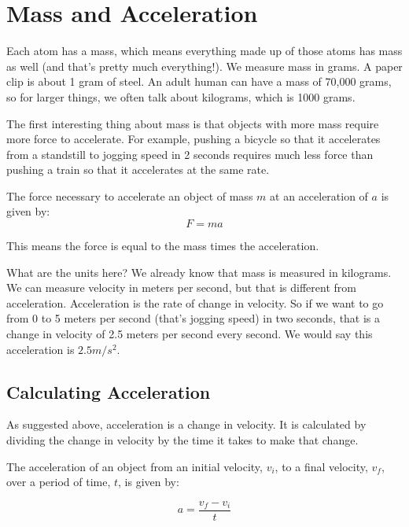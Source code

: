 \section{Mass and Acceleration}

Each atom has a mass, which means everything made up of those atoms has mass as well (and that's pretty much everything!). We measure mass in grams. A
paper clip is about 1 gram of steel. An adult human can have a mass of 70,000
grams, so for larger things, we often talk about kilograms, which
is 1000 grams.

The first interesting thing about mass is that objects with more mass
require more force to accelerate. For example, pushing a bicycle so
that it accelerates from a standstill to jogging speed in 2 seconds
requires much less force than pushing a train so that it accelerates
at the same rate.


\begin{mdframed}[style=important, frametitle={Newton's Second Law of Motion}]

The force necessary to accelerate an object of mass $m$ at an acceleration of
$a$ is given by:
$$F = m a$$

This means the force is equal to the mass times the acceleration.

\end{mdframed}

What are the units here? We already know that mass is measured in
kilograms. We can measure velocity in meters per second, but that is
different from acceleration. Acceleration is the rate of change in
velocity. So if we want to go from 0 to 5 meters per second (that's
jogging speed) in two seconds, that is a change in velocity of 2.5
meters per second every second. We would say this acceleration is $2.5
m/s^2$.

\subsection{Calculating Acceleration}
As suggested above, acceleration is a change in velocity. It is calculated by
dividing the change in velocity by the time it takes to make that change.

\begin{mdframed}[style = important, frametitle = {Calculating Acceleration}]
The acceleration of an object from an initial velocity, $v_i$, to a final
velocity, $v_f$, over a period of time, $t$, is given by:

$$a = \frac{v_f - v_i}{t}$$
\end{mdframed}

